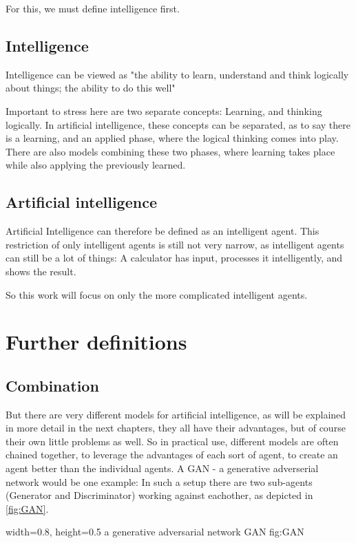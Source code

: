 For this, we must define intelligence first.
\subsection{Intelligence}
Intelligence can be viewed as "the ability to learn, understand and think logically about things; the ability to do this well" 

Important to stress here are two separate concepts: Learning, and thinking logically.
In artificial intelligence, these concepts can be separated, as to say there is a learning, and an applied phase, where the logical thinking comes into play. %
There are also models combining these two phases, where learning takes place while also applying the previously learned. 


\subsection{Artificial intelligence}
Artificial Intelligence can therefore be defined as an intelligent agent.
This restriction of only intelligent agents is still not very narrow, as intelligent agents can still be a lot of things: A calculator has input, processes it intelligently, and shows the result.

So this work will focus on only the more complicated intelligent agents.
\section{Further definitions}
\subsection{Combination}
But there are very different models for artificial intelligence, as will be explained in more detail in the next chapters, they all have their advantages, but of course their own little problems as well. So in practical use, different models are often chained together, to leverage the advantages of each sort of agent, to create an agent better than the individual agents. %
A GAN - a generative adverserial network would be one example: In such a setup there are two sub-agents (Generator and Discriminator) working against eachother, as depicted in \ref{fig:GAN}.

    {width=0.8\textwidth, height=0.5\textheight} %
    {a generative adversarial network}   %
    {GAN}   %
    {fig:GAN}    %


